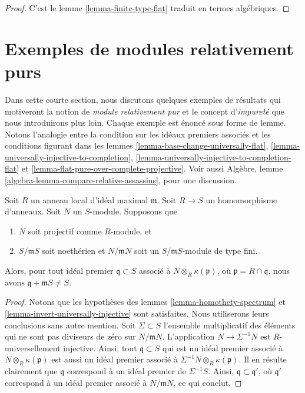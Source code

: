 \begin{proof}
C'est le lemme \ref{lemma-finite-type-flat} traduit en termes algébriques.
\end{proof}








\section{Exemples de modules relativement purs}
\label{section-examples-pure-modules}

\noindent
Dans cette courte section, nous discutons quelques exemples de résultats qui motiveront
la notion de {\it module relativement pur} et le
concept d'{\it impureté} que nous introduirons plus loin. Chaque
exemple est énoncé sous forme de lemme. Notons l'analogie entre la condition sur
les idéaux premiers associés et les conditions figurant dans les
lemmes \ref{lemma-base-change-universally-flat},
\ref{lemma-universally-injective-to-completion},
\ref{lemma-universally-injective-to-completion-flat} et
\ref{lemma-flat-pure-over-complete-projective}.
Voir aussi
Algèbre, lemme \ref{algebra-lemma-compare-relative-assassins},
pour une discussion.

\begin{lemma}
\label{lemma-explain-why-pure}
Soit $R$ un anneau local d'idéal maximal $\mathfrak m$.
Soit $R \to S$ un homomorphisme d'anneaux. Soit $N$ un $S$-module.
Supposons que
\begin{enumerate}
\item $N$ soit projectif comme $R$-module, et
\item $S/\mathfrak mS$ soit noethérien et $N/\mathfrak mN$ soit un
$S/\mathfrak mS$-module de type fini.
\end{enumerate}
Alors, pour tout idéal premier $\mathfrak q \subset S$ associé à
$N \otimes_R \kappa(\mathfrak p)$, où $\mathfrak p = R \cap \mathfrak q$,
nous avons $\mathfrak q + \mathfrak m S \not = S$.
\end{lemma}

\begin{proof}
Notons que les hypothèses des
lemmes \ref{lemma-homothety-spectrum} et
\ref{lemma-invert-universally-injective}
sont satisfaites. Nous utiliserons leurs conclusions sans autre
mention. Soit $\Sigma \subset S$ l'ensemble multiplicatif des éléments
qui ne sont pas diviseurs de zéro sur $N/\mathfrak mN$. L'application
$N \to \Sigma^{-1}N$ est $R$-universellement injective. Ainsi,
tout $\mathfrak q \subset S$ qui est un idéal premier associé à
$N \otimes_R \kappa(\mathfrak p)$ est aussi un idéal premier associé à
$\Sigma^{-1}N \otimes_R \kappa(\mathfrak p)$. Il en résulte clairement que
$\mathfrak q$ correspond à un idéal premier de $\Sigma^{-1}S$.
Ainsi, $\mathfrak q \subset \mathfrak q'$, où $\mathfrak q'$
correspond à un idéal premier associé à $N/\mathfrak mN$, ce qui conclut.
\end{proof}

